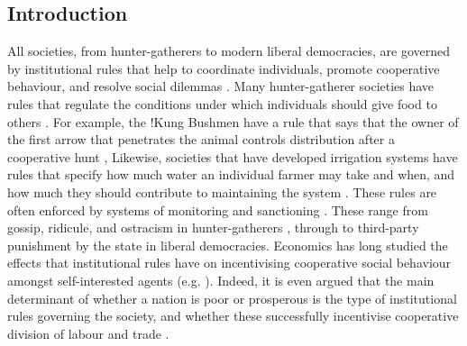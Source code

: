 \documentclass{rstb}
\begin{document}
\begin{linenumbers}

\section{Introduction}
All societies, from hunter-gatherers to modern liberal democracies, are governed by institutional rules \cite{North:1990:a,Ostrom:1990:a} that help to coordinate individuals, promote cooperative behaviour, and resolve social dilemmas \cite{Greif:2006:a,Singh:2017:a,Powers:2021:a}. Many hunter-gatherer societies have rules that regulate the conditions under which individuals should give food to others \cite{Kaplan:2009:a}. For example, the !Kung Bushmen have a rule that says that the owner of the first arrow that penetrates the animal controls distribution after a cooperative hunt \cite{Testart:1987:a},  Likewise, societies that have developed irrigation systems have rules that specify how much water an individual farmer may take and when, and how much they should contribute to maintaining the system \cite{Ostrom:1990:a,Guala:2012:a}. These rules are often enforced by systems of monitoring and sanctioning \cite{Powers:2021:a}. These range from gossip, ridicule, and ostracism in hunter-gatherers \cite{Boehm:1999:a}, through to third-party punishment by the state in liberal democracies. Economics has long studied the effects that institutional rules have on incentivising cooperative social behaviour amongst self-interested agents (e.g. \cite{North:1990:a,Reiter:1996:a,Greif:2006:a}). Indeed, it is even  argued that the main determinant of whether a nation is poor or prosperous is the type of institutional rules governing the society, and whether these successfully incentivise cooperative division of labour and trade \cite{Acemoglu:2011:a}. 


\end{linenumbers}
\end{document}
